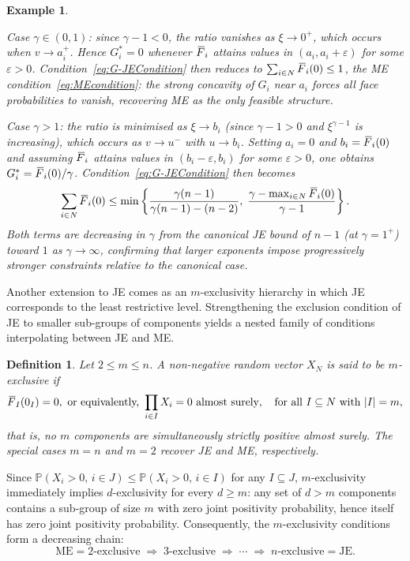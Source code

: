 \documentclass[letterpaper,12pt]{article}
\def \P {\mathbb{P}}
\numberwithin{equation}{section}
\newtheorem{definition}[theorem]{Definition}
\newtheorem{example}[theorem]{Example}
\newcommand{\N}{{N}}
\newcommand{\I}{{I}}
\newcommand{\F}{\,\overline{\kern-0.175em F\kern-0em}}
\begin{document}
{\begin{example}
\begin{itemize}
\noindent\textit{Case $\gamma\in(0,1)$}: since $\gamma-1<0$, the ratio vanishes
as $\xi\to0^+$, which occurs when $v\to a_i^+$. Hence $G_i^*=0$ whenever $\F_i$
attains values in $(a_i,a_i+\varepsilon)$ for some $\varepsilon>0$.
Condition~\eqref{eq:G-JECondition} then reduces to $\sum_{i\in\N}\F_i(0)\le 1$,
the ME condition~\eqref{eq:MEcondition}: the strong concavity of $G_i$ near
$a_i$ forces all face probabilities to vanish, recovering ME as the only feasible
structure.

\noindent\textit{Case $\gamma>1$}: the ratio is minimised as $\xi\to b_i$
(since $\gamma-1>0$ and $\xi^{\gamma-1}$ is increasing), which occurs as
$v\to u^-$ with $u\to b_i$. Setting $a_i=0$ and $b_i=\F_i(0)$ and assuming
$\F_i$ attains values in $(b_i-\varepsilon,b_i)$ for some $\varepsilon>0$, one
obtains $G_i^*=\F_i(0)/\gamma$. Condition~\eqref{eq:G-JECondition} then becomes
\[
\sum_{i\in\N}\F_i(0)
\le\min\left\{
\frac{\gamma(n-1)}{\gamma(n-1)-(n-2)},\;
\frac{\gamma-\max_{i\in\N}\F_i(0)}{\gamma-1}
\right\}.
\]
Both terms are decreasing in $\gamma$ from the canonical JE bound of $n-1$ (at
$\gamma=1^+$) toward $1$ as $\gamma\to\infty$, confirming that larger exponents
impose progressively stronger constraints relative to the canonical case.
\end{itemize}
\end{example}

Another extension to JE comes as an $m$-exclusivity hierarchy in which JE corresponds to the
least restrictive level. Strengthening the exclusion condition of JE to smaller sub-groups of
components yields a nested family of conditions interpolating between JE and ME.

\begin{definition}
\label{def:m_exclusive}
Let $2\le m\le n$. A non-negative random vector $X_{\N}$ is said to be
\emph{$m$-exclusive} if
\[
\F_{I}(0_{I})=0,\text{ or equivalently, }
    \prod_{i\in\I}X_i=0\text{ almost surely},\quad\text{for all }I\subseteq\N\text{ with }|I|=m,
\]
that is, no $m$ components are simultaneously strictly positive almost surely.
The special cases $m=n$ and $m=2$ recover JE and ME, respectively.
\end{definition}

Since $\P(X_i>0,\,i\in J)\le \P(X_i>0,\,i\in I)$ for any $I\subseteq J$,
$m$-exclusivity immediately implies $d$-exclusivity for every $d\ge m$: any
set of $d>m$ components contains a sub-group of size $m$ with zero joint
positivity probability, hence itself has zero joint positivity probability.
Consequently, the $m$-exclusivity conditions form a decreasing chain:
\[
\text{ME} = 2\text{-exclusive}
\;\Rightarrow\;3\text{-exclusive}
\;\Rightarrow\;\cdots
\;\Rightarrow\;n\text{-exclusive} = \text{JE}.
\]

}
\end{document}
